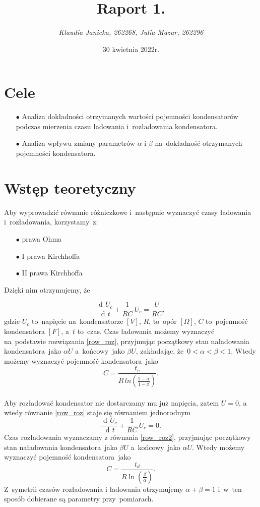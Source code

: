\documentclass[12pt]{mwart}
\title{\textbf{Raport 1.}}
\author{\fontsize{12pt}{12pt}\selectfont \emph{Klaudia Janicka, 262268, Julia Mazur, 262296}}
\date{30 kwietnia 2022r.}
\DeclareMathOperator{\diff}{d\!}
\begin{document}
	\maketitle
	\section{Cele}
	\begin{itemize}
		\item[$\bullet$] Analiza dokładności otrzymanych wartości pojemności kondensatorów podczas mierzenia czasu ładowania i~rozładowania kondensatora.
		\item[$\bullet$] Analiza wpływu zmiany parametrów $\alpha$ i $\beta$ na~dokładność otrzymanych pojemności kondensatora.
	\end{itemize}
	\section{Wstęp teoretyczny}
	\noindent Aby wyprowadzić równanie różniczkowe i~następnie wyznaczyć czasy ładowania i~rozładowania, korzystamy~z:
	\begin{itemize}
		\item[$\bullet$] prawa Ohma
		\item[$\bullet$] I prawa Kirchhoffa
		\item[$\bullet$] II prawa Kirchhoffa
	\end{itemize}
	Dzięki nim otrzymujemy, że 
	
	\begin{equation}\label{row_roz}
		\frac{\diff U_{c}}{\diff t} +\frac{1}{RC}\, U_{c}=\frac{U}{RC},
	\end{equation}
	gdzie $U_{c}$ to~napięcie na~kondensatorze $\left[V\right]$, $R$, to~opór $\left[\Omega\right]$, $C$ to~pojemność kondensatora $\left[F\right]$, a~$t$ to~czas.
	Czas ładowania możemy wyznaczyć na~podstawie rozwiązania \ref{row_roz}, przyjmując początkowy stan naładowania kondensatora~jako $\alpha U$ a~końcowy~jako $\beta U$, zakładając, że~$0 < \alpha < \beta < 1$. Wtedy możemy wyznaczyć pojemność kondensatora~jako $$C=\frac{t_{c}}{R\,ln\left(\frac{1-\alpha}{1-\beta}\right)}.$$\label{poj_lad}
	\phantom{a}\\
	Aby rozładować kondensator nie dostarczamy mu już napięcia, zatem $U = 0$, a wtedy równanie \ref{row_roz} staje się równaniem jednorodnym
	\begin{equation}\label{row_roz2}
		\frac{\diff U_{c}}{\diff t} +\frac{1}{RC}\, U_{c}=0.
	\end{equation}
	Czas rozładowania wyznaczamy z równania \ref{row_roz2}, przyjmując początkowy stan naładowania kondensatora~jako $\beta U$ a~końcowy~jako $\alpha U$. Wtedy możemy wyznaczyć pojemność kondensatora~jako
	$$C=\frac{t_d}{R\ln\left({\frac{\beta}{\alpha}}\right)}.$$
	Z~symetrii czasów rozładowania i ładowania otrzymujemy $\alpha+\beta=1$ i~w~ten sposób dobierane są parametry przy~pomiarach.
\end{document}
